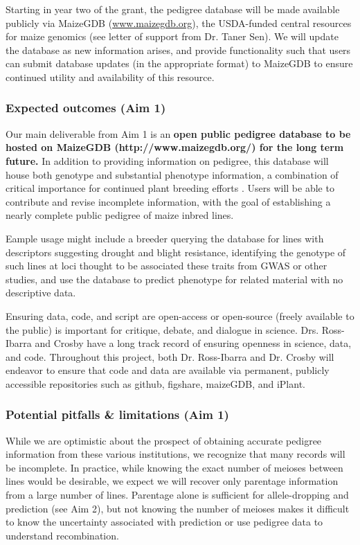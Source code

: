 \documentclass[12pt]{article}
\begin{document}
Starting in year two of the grant, the pedigree database will be made available publicly via MaizeGDB (\url{www.maizegdb.org}), the USDA-funded central resources for maize genomics (see letter of support from Dr. Taner Sen).
We will update the database as new information arises, and provide functionality such that users can submit database updates (in the appropriate format) to MaizeGDB to ensure continued utility and availability of this resource.

\subsubsection*{Expected outcomes (Aim 1)}
Our main deliverable from Aim 1 is an \textbf{open public pedigree database to be hosted on MaizeGDB (http://www.maizegdb.org/) for the long term future.} 
In addition to providing information on pedigree, this database will house both genotype and substantial phenotype information, a combination of critical importance for continued plant breeding efforts \citep{zamir2013have}.
Users will be able to contribute and revise incomplete information, with the goal of establishing a nearly complete public pedigree of maize inbred lines.   

Eample usage might include a breeder querying the database for lines with descriptors suggesting drought and blight resistance, identifying the genotype of such lines at loci thought to be associated these traits from GWAS or other studies, and use the database to predict phenotype for related material with no descriptive data.

Ensuring data, code, and script are open-access or open-source (freely available to the public) is important for critique, debate, and dialogue in science. 
Drs. Ross-Ibarra and Crosby have a long track record of ensuring openness in science, data, and code. Throughout this project, both Dr. Ross-Ibarra and Dr. Crosby will endeavor to ensure that code and data are available via permanent, publicly accessible repositories such as github, figshare, maizeGDB, and iPlant.

\subsubsection*{Potential pitfalls \& limitations (Aim 1)}

While we are optimistic about the prospect of obtaining accurate pedigree information from these various institutions, we recognize that many records will be incomplete. 
In practice, while knowing the exact number of meioses between lines would be desirable, we expect we will recover only parentage information from a large number of lines. 
Parentage alone is sufficient for allele-dropping and prediction (see Aim 2), but not knowing the number of meioses makes it difficult to know the uncertainty associated with prediction or use pedigree data to understand recombination.
 
\end{document}

